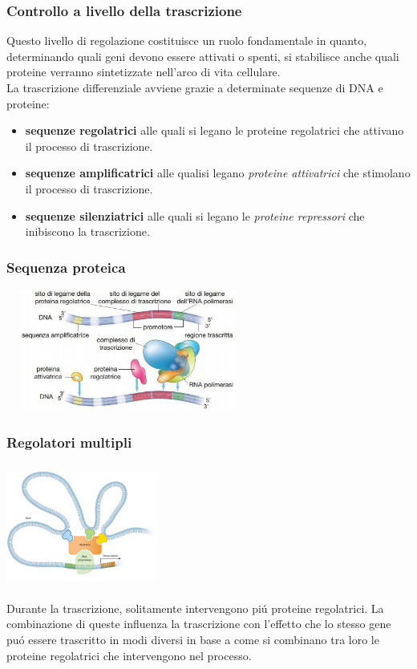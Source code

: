 \documentclass[hyperref={pdfpagelabels=false}]{beamer}
\begin{document}
\begin{frame} \frametitle{Controllo a livello della trascrizione}
Questo livello di regolazione costituisce un ruolo fondamentale in quanto, determinando quali geni devono essere attivati o spenti, si stabilisce anche quali proteine verranno sintetizzate nell'arco di vita cellulare.\\
La trascrizione differenziale avviene grazie a determinate sequenze di DNA e proteine:
\begin{itemize}
\item \textbf{sequenze regolatrici} alle quali si legano le proteine regolatrici che attivano il processo di trascrizione.
\item \textbf{sequenze amplificatrici} alle qualisi legano \emph{proteine attivatrici} che stimolano il processo di trascrizione.
\item \textbf{sequenze silenziatrici} alle quali si legano le \emph{proteine repressori} che inibiscono la trascrizione.
\end{itemize}
\end{frame}


\begin{frame}\frametitle{Sequenza proteica}
\centering \includegraphics[width=8cm,height=4cm]{sequenzeProteine.jpg}
\end{frame}


\begin{frame}\frametitle{Regolatori multipli}
\begin{minipage}[c]{.45\textwidth}
\includegraphics[width=5cm,height=4cm]{regolatori.jpg}
\end{minipage}
\begin{minipage}[c]{.5\textwidth}
Durante la trascrizione, solitamente intervengono pi\'u proteine regolatrici. La combinazione di queste influenza la trascrizione con l'effetto che lo stesso gene pu\'o essere trascritto in modi diversi in base a come si combinano tra loro le proteine regolatrici che intervengono nel processo.
\end{minipage}
\end{frame}
\end{document}
